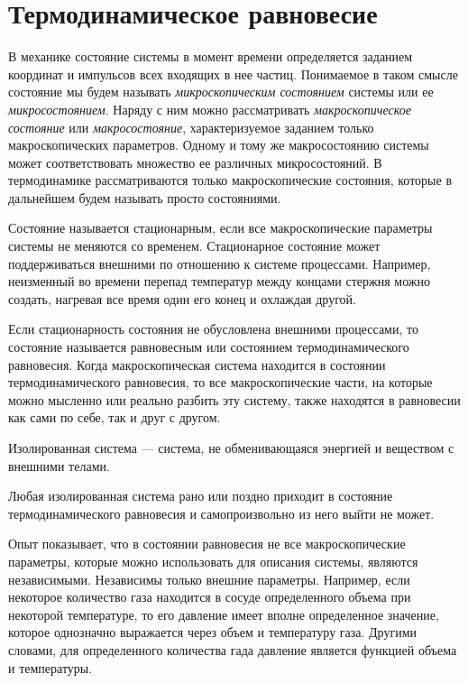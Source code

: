 \section{Термодинамическое равновесие}

	В механике состояние системы в момент времени определяется заданием координат и импульсов всех входящих в нее частиц. Понимаемое в таком смысле состояние мы будем называть \textit{микроскопическим состоянием} системы или ее \textit{микросостоянием}. Наряду с ним можно рассматривать \textit{макроскопическое состояние} или \textit{макросостояние}, характеризуемое заданием только макроскопических параметров. Одному и тому же макросостоянию системы может соответствовать множество ее различных микросостояний. В термодинамике рассматриваются только макроскопические состояния, которые в дальнейшем будем называть просто состояниями. \par
	Состояние называется стационарным, если все макроскопические параметры системы не меняются со временем. Стационарное состояние может поддерживаться внешними по отношению к системе процессами. Например, неизменный во времени перепад температур между концами стержня можно создать, нагревая все время один его конец и охлаждая другой. \par
	Если стационарность состояния не обусловлена внешними процессами, то состояние называется равновесным или состоянием термодинамического равновесия. Когда макроскопическая система находится в состоянии термодинамического равновесия, то все макроскопические части, на которые можно мысленно или реально разбить эту систему, также находятся в равновесии как сами по себе, так и друг с другом.\par
	Изолированная система --- система, не обменивающаяся энергией и веществом с внешними телами.
	\begin{post}
		Любая изолированная система рано или поздно приходит в состояние термодинамического равновесия и самопроизвольно из него выйти не может.
	\end{post}
	Опыт показывает, что в состоянии равновесия не все макроскопические параметры, которые можно использовать для описания системы, являются независимыми. Независимы только внешние параметры. Например, если некоторое количество газа находится в сосуде определенного объема при некоторой температуре, то его давление имеет вполне определенное значение, которое однозначно выражается через объем и температуру газа. Другими словами, для определенного количества гада давление является функцией объема и температуры.